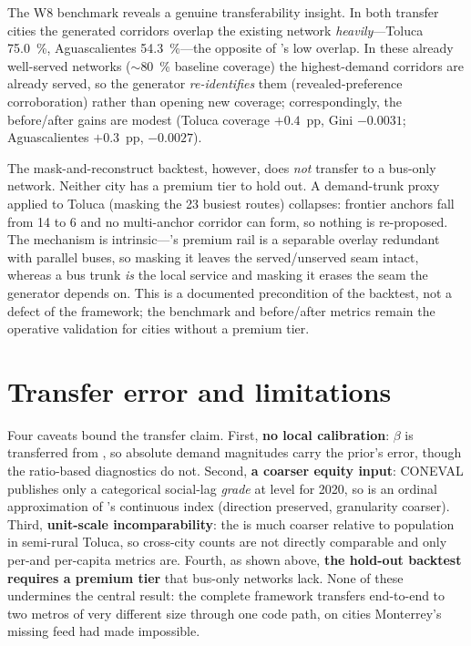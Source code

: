 The W8 benchmark reveals a genuine transferability insight. In both transfer cities
the generated corridors overlap the existing network \emph{heavily}---Toluca
\SI{75.0}{\percent}, Aguascalientes \SI{54.3}{\percent}---the opposite of \zmg's low
overlap. In these already well-served networks ($\sim$\SI{80}{\percent} baseline
coverage) the highest-demand corridors are already served, so the generator
\emph{re-identifies} them (revealed-preference corroboration) rather than opening new
coverage; correspondingly, the before/after gains are modest (Toluca coverage
$+\num{0.4}$~pp, Gini $-\num{0.0031}$; Aguascalientes $+\num{0.3}$~pp,
$-\num{0.0027}$).

The mask-and-reconstruct backtest, however, does \emph{not} transfer to a bus-only
network. Neither city has a premium tier to hold out. A demand-trunk proxy applied to
Toluca (masking the \num{23} busiest routes) collapses: frontier anchors fall from
\num{14} to \num{6} and no multi-anchor corridor can form, so nothing is re-proposed.
The mechanism is intrinsic---\zmg's premium rail is a separable overlay redundant with
parallel buses, so masking it leaves the served/unserved seam intact, whereas a bus
trunk \emph{is} the local service and masking it erases the seam the generator depends
on. This is a documented precondition of the backtest, not a defect of the framework;
the benchmark and before/after metrics remain the operative validation for cities
without a premium tier.

\section{Transfer error and limitations}
\label{sec:transf-limits}

Four caveats bound the transfer claim. First, \textbf{no local calibration}: $\beta$
is transferred from \zmg, so absolute demand magnitudes carry the prior's error,
though the ratio-based diagnostics do not. Second, \textbf{a coarser equity input}:
CONEVAL publishes only a categorical social-lag \emph{grade} at \ageb level for 2020,
so  is an ordinal approximation of \zmg's continuous index
(direction preserved, granularity coarser). Third, \textbf{unit-scale incomparability}:
the \ageb is much coarser relative to population in semi-rural Toluca, so cross-city
\ageb counts are not directly comparable and only per-\ageb and per-capita metrics
are. Fourth, as shown above, \textbf{the hold-out backtest requires a premium tier}
that bus-only networks lack. None of these undermines the central result: the
complete framework transfers end-to-end to two metros of very different size through
one code path, on cities Monterrey's missing feed had made impossible.
